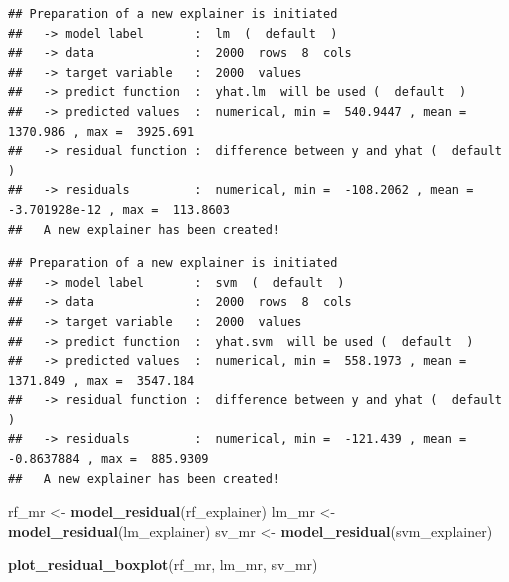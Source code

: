 \documentclass[12pt,]{krantz}
\newenvironment{Shaded}{\begin{snugshade}}{\end{snugshade}}
\newcommand{\DataTypeTok}[1]{\textcolor[rgb]{0.13,0.29,0.53}{#1}}
\newcommand{\KeywordTok}[1]{\textcolor[rgb]{0.13,0.29,0.53}{\textbf{#1}}}
\newcommand{\NormalTok}[1]{#1}
\newcommand{\OperatorTok}[1]{\textcolor[rgb]{0.81,0.36,0.00}{\textbf{#1}}}
\newcommand{\OtherTok}[1]{\textcolor[rgb]{0.56,0.35,0.01}{#1}}
\newcommand{\StringTok}[1]{\textcolor[rgb]{0.31,0.60,0.02}{#1}}
\begin{document}
\begin{verbatim}
## Preparation of a new explainer is initiated
##   -> model label       :  lm  (  default  )
##   -> data              :  2000  rows  8  cols 
##   -> target variable   :  2000  values 
##   -> predict function  :  yhat.lm  will be used (  default  )
##   -> predicted values  :  numerical, min =  540.9447 , mean =  1370.986 , max =  3925.691  
##   -> residual function :  difference between y and yhat (  default  )
##   -> residuals         :  numerical, min =  -108.2062 , mean =  -3.701928e-12 , max =  113.8603  
##   A new explainer has been created!
\end{verbatim}

\begin{Shaded}
\end{Shaded}

\begin{verbatim}
## Preparation of a new explainer is initiated
##   -> model label       :  svm  (  default  )
##   -> data              :  2000  rows  8  cols 
##   -> target variable   :  2000  values 
##   -> predict function  :  yhat.svm  will be used (  default  )
##   -> predicted values  :  numerical, min =  558.1973 , mean =  1371.849 , max =  3547.184  
##   -> residual function :  difference between y and yhat (  default  )
##   -> residuals         :  numerical, min =  -121.439 , mean =  -0.8637884 , max =  885.9309  
##   A new explainer has been created!
\end{verbatim}

\begin{Shaded}
\begin{Highlighting}[]
\NormalTok{rf_mr <-}\StringTok{ }\KeywordTok{model_residual}\NormalTok{(rf_explainer)}
\NormalTok{lm_mr <-}\StringTok{ }\KeywordTok{model_residual}\NormalTok{(lm_explainer)}
\NormalTok{sv_mr <-}\StringTok{ }\KeywordTok{model_residual}\NormalTok{(svm_explainer)}

\KeywordTok{plot_residual_boxplot}\NormalTok{(rf_mr, lm_mr, sv_mr)}
\end{Highlighting}
\end{Shaded}
\end{document}

